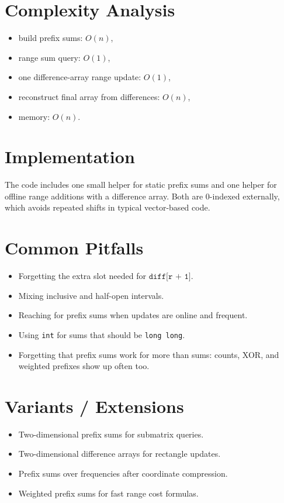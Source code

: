 \section*{Complexity Analysis}

\begin{itemize}
  \item build prefix sums: \(O(n)\),
  \item range sum query: \(O(1)\),
  \item one difference-array range update: \(O(1)\),
  \item reconstruct final array from differences: \(O(n)\),
  \item memory: \(O(n)\).
\end{itemize}

\section*{Implementation}

The code includes one small helper for static prefix sums and one helper for offline range additions with a difference
array. Both are 0-indexed externally, which avoids repeated shifts in typical vector-based code.

\section*{Common Pitfalls}

\begin{itemize}
  \item Forgetting the extra slot needed for \(\texttt{diff[r + 1]}\).
  \item Mixing inclusive and half-open intervals.
  \item Reaching for prefix sums when updates are online and frequent.
  \item Using \texttt{int} for sums that should be \texttt{long long}.
  \item Forgetting that prefix sums work for more than sums: counts, XOR, and weighted prefixes show up often too.
\end{itemize}

\section*{Variants / Extensions}

\begin{itemize}
  \item Two-dimensional prefix sums for submatrix queries.
  \item Two-dimensional difference arrays for rectangle updates.
  \item Prefix sums over frequencies after coordinate compression.
  \item Weighted prefix sums for fast range cost formulas.
\end{itemize}

